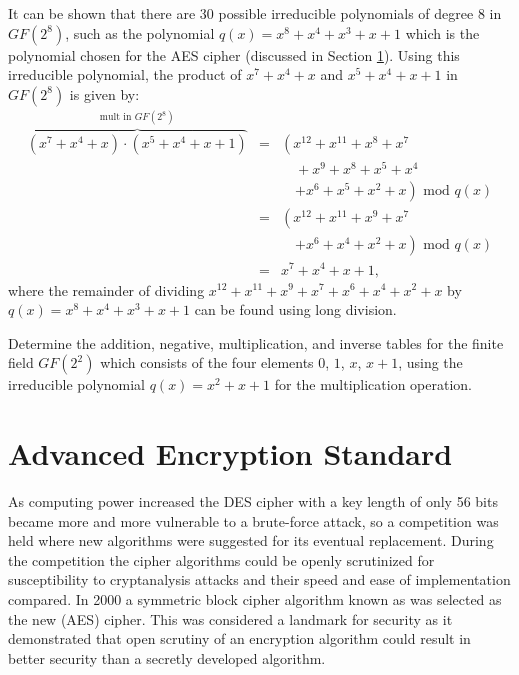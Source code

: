 It can be shown that there are 30 possible irreducible polynomials of degree $8$
in $GF(2^8)$, such as the polynomial $q(x)=x^8+x^4+x^3+x+1$
which is the polynomial chosen for the AES cipher (discussed in Section
\ref{Se:AdvancedEncryptionStandard}).
Using this irreducible polynomial, the product of $x^7+x^4+x$ and $x^5+x^4+x+1$
in $GF(2^8)$ is given by:
\begin{eqnarray*}
  \overbrace{\left(x^7+x^4+x\right)\cdot\left(x^5+x^4+x+1\right)}^{\mbox{mult in }GF(2^8)}
  &=&  \left( x^{12}+x^{11}+x^8+x^7\right. \\
  &&  \quad+x^9+x^8+x^5+x^4 \\
  &&  \quad\left.+x^6+x^5+x^2+x \right) \mbox{ mod } q(x) \\
  &=& \left( x^{12}+x^{11}+x^9+x^7 \right. \\
  &&  \quad\left.+x^6+x^4+x^2+x \right) \mbox{ mod } q(x) \\
  &=& x^7+x^4+x+1,
\end{eqnarray*}
where the remainder of dividing $x^{12}+x^{11}+x^9+x^7+x^6+x^4+x^2+x$
by $q(x)=x^8+x^4+x^3+x+1$ can be found using long division.


\begin{exercise}
  Determine the addition, negative, multiplication, and inverse tables
  for the finite field $GF(2^2)$ which consists of the four elements
  $0$, $1$, $x$, $x+1$, using the irreducible polynomial
  $q(x)=x^2+x+1$ for the multiplication operation.
\end{exercise}



\section{Advanced Encryption Standard}\label{Se:AdvancedEncryptionStandard}

As computing power increased the DES cipher with a key length of only 56 bits
became more and more vulnerable to a brute-force attack,
so a competition was held where new algorithms were suggested for its eventual
replacement. During the competition the cipher algorithms
could be openly scrutinized for susceptibility to cryptanalysis
attacks and their speed and ease of implementation compared.
In 2000 a symmetric block cipher algorithm known as  was
selected as the new  (AES) cipher.
This was considered a landmark for security as it demonstrated that
open scrutiny of an encryption algorithm could result in better security
than a secretly developed algorithm.

